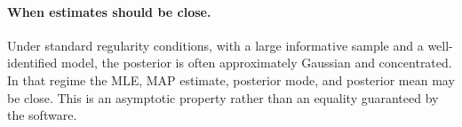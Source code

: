 \paragraph{When estimates should be close.}
Under standard regularity conditions, with a large informative sample and a
well-identified model, the posterior is often approximately Gaussian and concentrated.
In that regime the MLE, MAP estimate, posterior mode, and posterior mean may be close.
This is an asymptotic property rather than an equality guaranteed by the software.

